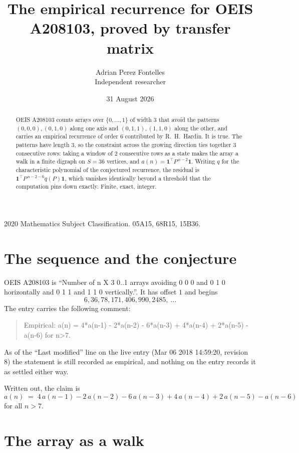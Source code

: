 \documentclass[11pt,a4paper]{article}
\title{The empirical recurrence for OEIS A208103, proved by transfer matrix}
\author{Adrian Perez Fontelles\\ \small Independent researcher}
\date{31 August 2026}
\theoremstyle{plain}
\theoremstyle{definition}
\begin{document}
\maketitle

\begin{abstract}
OEIS A208103 counts arrays over $\{0,\dots,1\}$ of width $3$ that avoid the patterns
$(0,0,0), (0,1,0)$ along one axis and $(0,1,1), (1,1,0)$ along the other, and carries an empirical recurrence of
order $6$ contributed by R.~H.~Hardin. It is true. The patterns have length $3$, so
the constraint across the growing direction ties together $3$ consecutive rows: taking a
window of $2$ consecutive rows as a state makes the array a walk in a finite digraph
on $S=36$ vertices, and $a(n)=\mathbf{1}^{\!\top}P^{\,n-2}\mathbf{1}$. Writing $q$
for the characteristic polynomial of the conjectured recurrence, the residual is
$\mathbf{1}^{\!\top}P^{\,n-2-6}q(P)\mathbf{1}$, which vanishes identically
beyond a threshold that the computation pins down exactly. Finite, exact, integer.
\end{abstract}

\noindent\small 2020 Mathematics Subject Classification. 05A15, 68R15, 15B36.\normalsize

\section{The sequence and the conjecture}

OEIS A208103 is ``Number of n X 3 0..1 arrays avoiding 0 0 0 and 0 1 0 horizontally and 0 1 1 and 1 1 0 vertically.''. It has offset
$1$ and begins
\[
6, 36, 78, 171, 406, 990, 2485,\ \dots
\]
The entry carries the following comment:
\begin{quote}\small
Empirical: a(n) = 4*a(n-1) - 2*a(n-2) - 6*a(n-3) + 4*a(n-4) + 2*a(n-5) - a(n-6) for n>7.
\end{quote}
As of the ``Last modified'' line on the live entry (Mar 06 2018 14:59:20, revision
8) the statement is still recorded as empirical, and nothing on the entry
records it as settled either way.

Written out, the claim is
\begin{equation}\label{eq:conj}
a(n)\;=\;4\,a(n-1) - 2\,a(n-2) - 6\,a(n-3) + 4\,a(n-4) + 2\,a(n-5) - a(n-6)
\end{equation}
for all $n>7$. 

\section{The array as a walk}
\end{document}

